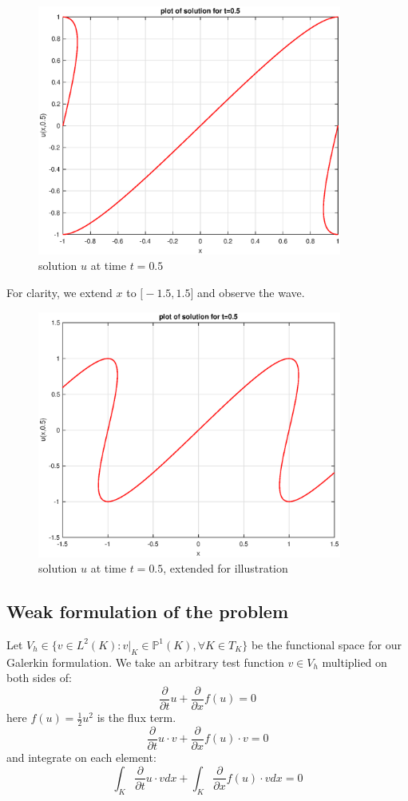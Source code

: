 \documentclass[12pt]{article} %
\newcommand{\pdx}[1]{\frac{\partial}{\partial {#1}}}
\newcommand{\1}[1]{\mathds{1}\left[#1\right]}
\begin{document}
\begin{figure}[t]
\includegraphics[width=10cm]{u_5.eps}
\centering
\caption{solution $u$ at time $t = 0.5$}
\end{figure}

\newpage
For clarity, we extend $x$ to $\big[-1.5,1.5\big]$ and observe the wave.

\begin{figure}[t]
\includegraphics[width=10cm]{e_5_2.eps}
\centering
\caption{solution $u$ at time $t = 0.5$, extended for illustration}
\end{figure}



\newpage
\subsection{Weak formulation of the problem}
Let $V_h\in \{v\in L^2(K): v\rvert_{K}\in \mathbb{P}^1(K), \forall K \in T_K\}$ be the functional space for our Galerkin formulation. We take an arbitrary test function $v\in V_h$ multiplied on both sides of:
$$
	\pdx{t}u + \pdx{x}f(u) = 0
$$ here $f(u) = \frac12 u^2$ is the flux term.
$$
	\pdx{t} u\cdot v + \pdx{x}f(u) \cdot v = 0
$$ and integrate on each element:
$$
	\int_{K}\pdx{t}u\cdot v dx+ \int_{K}\pdx{x}f(u)\cdot vdx = 0
$$
\end{document}
